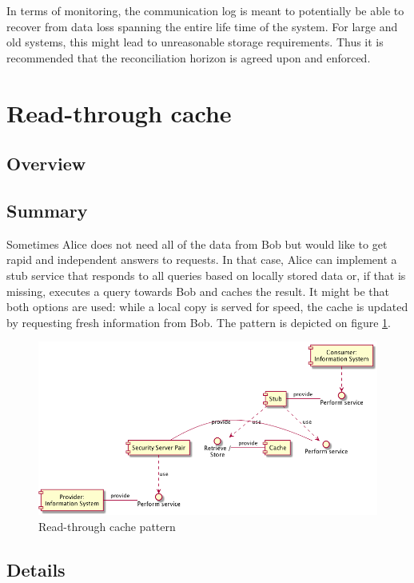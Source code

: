 \documentclass[10pt,a4paper]{article}
\begin{document}
In terms of monitoring, the communication log is meant to potentially be able to recover from data loss spanning the entire life time of the system. For large and old systems, this might lead to unreasonable storage requirements. Thus it is recommended that the reconciliation horizon is agreed upon and enforced. 

\section{Read-through cache}
\label{sec:p:13}
\subsection{Overview}
\subsection{Summary}
Sometimes Alice does not need all of the data from Bob but would like to get rapid and independent answers to requests. In that case, Alice can implement a stub service that responds to all queries based on locally stored data or, if that is missing, executes a query towards Bob and caches the result. It might be that both options are used: while a local copy is served for speed, the cache is updated by requesting fresh information from Bob. The pattern is depicted on figure \ref{fig:p:13}.

\begin{figure}[htp]
	\begin{center}
		\includegraphics[width=1\textwidth]{13_comp.png}
		\caption{Read-through cache pattern}
		\label{fig:p:13}
	\end{center}
\end{figure}

\subsection{Details}
\end{document}

